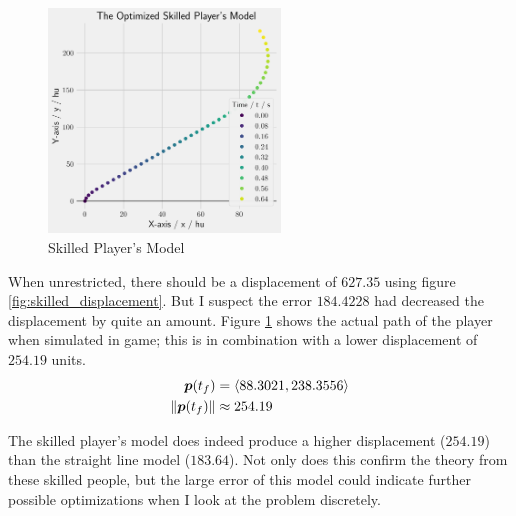 \begin{figure}[H]
    \centering
    \includegraphics[width=0.55\textwidth]{assets/skilled_player.png}
    \caption{Skilled Player's Model}
    \label{fig:skilled_player}
\end{figure}


When unrestricted, there should be a displacement of $627.35$ using figure \ref{fig:skilled_displacement}. But I suspect the error $184.4228$ had decreased the displacement by quite an amount. Figure \ref{fig:skilled_player} shows the actual path of the player when simulated in game; this is in combination with a lower displacement of $254.19$ units.
\begin{align*}
    \boldsymbol{p}(t_f) &= \left\langle 88.3021, 238.3556 \right\rangle\\
    \|\boldsymbol{p}(t_f)\| &\approx 254.19
\end{align*}

The skilled player's model does indeed produce a higher displacement ($254.19$) than the straight line model ($183.64$). Not only does this confirm the theory from these skilled people, but the large error of this model could indicate further possible optimizations when I look at the problem discretely.
